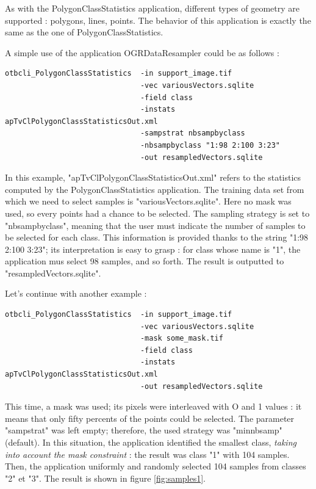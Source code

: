 As with the PolygonClassStatistics application, different types  of geometry are supported : polygons, lines, points. 
The behavior of this application is exactly the same as the one of PolygonClassStatistics.


A simple use of the application OGRDataResampler could be as follows :
\begin{verbatim}
otbcli_PolygonClassStatistics  -in support_image.tif
                               -vec variousVectors.sqlite
                               -field class
                               -instats apTvClPolygonClassStatisticsOut.xml
                               -sampstrat nbsampbyclass
                               -nbsampbyclass "1:98 2:100 3:23"
                               -out resampledVectors.sqlite
\end{verbatim}

In this example, "apTvClPolygonClassStatisticsOut.xml" refers to the statistics computed by the PolygonClassStatistics application.
The training data set from which we need to select samples is "variousVectors.sqlite". Here no mask was used, so every points had a chance to be selected.
The sampling strategy is set to "nbsampbyclass", meaning that the user must indicate the number of samples to be selected for each class.
This information is provided thanks to the string "1:98 2:100 3:23"; its interpretation is easy to grasp : 
for class whose name is "1", the application mus select 98 samples, and so forth.
The result is outputted to "resampledVectors.sqlite".

Let's continue with another example :
\begin{verbatim}
otbcli_PolygonClassStatistics  -in support_image.tif
                               -vec variousVectors.sqlite
                               -mask some_mask.tif
                               -field class
                               -instats apTvClPolygonClassStatisticsOut.xml
                               -out resampledVectors.sqlite
\end{verbatim}

This time, a mask was used; its pixels were interleaved with O and 1 values : it means that only fifty percents of the points could be selected.
The parameter "sampstrat" was left empty; therefore, the used strategy was "minnbsamp" (default). 
In this situation, the application identified the smallest class, \textit{taking into account the mask constraint} : 
the result was class "1" with 104 samples. Then, the application uniformly and randomly selected 104 samples from classes "2" et "3".
The result is shown in figure \ref{fig:samples1}.

